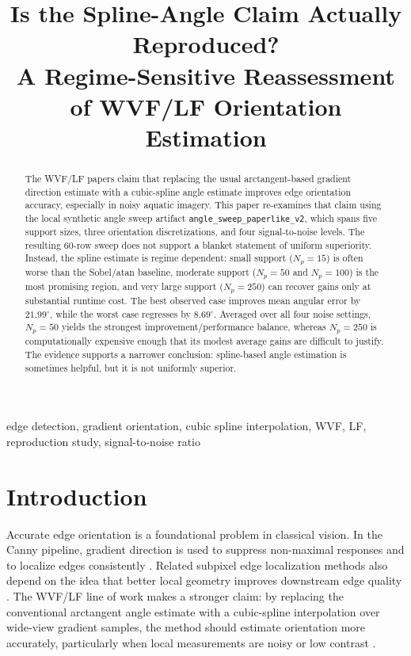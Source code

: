 \documentclass[conference]{IEEEtran}
\title{Is the Spline-Angle Claim Actually Reproduced?\\A Regime-Sensitive Reassessment of WVF/LF Orientation Estimation}
\author{\IEEEauthorblockN{Reproduction Study}
\IEEEauthorblockA{Edge-Detection Filter Critique Project}}
\begin{document}
\maketitle

\begin{abstract}
The WVF/LF papers claim that replacing the usual arctangent-based gradient direction estimate with a cubic-spline angle estimate improves edge orientation accuracy, especially in noisy aquatic imagery. This paper re-examines that claim using the local synthetic angle sweep artifact \texttt{angle\_sweep\_paperlike\_v2}, which spans five support sizes, three orientation discretizations, and four signal-to-noise levels. The resulting 60-row sweep does not support a blanket statement of uniform superiority. Instead, the spline estimate is regime dependent: small support (\(N_p=15\)) is often worse than the Sobel/atan baseline, moderate support (\(N_p=50\) and \(N_p=100\)) is the most promising region, and very large support (\(N_p=250\)) can recover gains only at substantial runtime cost. The best observed case improves mean angular error by \(21.99^{\circ}\), while the worst case regresses by \(8.69^{\circ}\). Averaged over all four noise settings, \(N_p=50\) yields the strongest improvement/performance balance, whereas \(N_p=250\) is computationally expensive enough that its modest average gains are difficult to justify. The evidence supports a narrower conclusion: spline-based angle estimation is sometimes helpful, but it is not uniformly superior.
\end{abstract}

\begin{IEEEkeywords}
edge detection, gradient orientation, cubic spline interpolation, WVF, LF, reproduction study, signal-to-noise ratio
\end{IEEEkeywords}

\section{Introduction}
Accurate edge orientation is a foundational problem in classical vision. In the Canny pipeline, gradient direction is used to suppress non-maximal responses and to localize edges consistently \cite{canny1986}. Related subpixel edge localization methods also depend on the idea that better local geometry improves downstream edge quality \cite{trujillo2013}. The WVF/LF line of work makes a stronger claim: by replacing the conventional arctangent angle estimate with a cubic-spline interpolation over wide-view gradient samples, the method should estimate orientation more accurately, particularly when local measurements are noisy or low contrast \cite{bagan2023thesis,bagan2025wvf,bagan2025msmd}.
\end{document}
